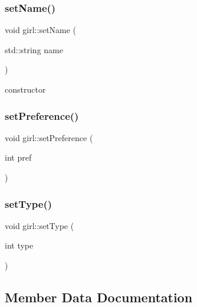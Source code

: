 \mbox{\label{classgirl_acbf8f5cee4f0cf24df3c96fc43666b43}} 
\subsubsection{\texorpdfstring{set\+Name()}{setName()}}
{\footnotesize\ttfamily void girl\+::set\+Name (\begin{DoxyParamCaption}\item[{std\+::string}]{name }\end{DoxyParamCaption})}



constructor 

\mbox{\label{classgirl_afdd10cabb120b9bbc44c8c243168baf3}} 
\subsubsection{\texorpdfstring{set\+Preference()}{setPreference()}}
{\footnotesize\ttfamily void girl\+::set\+Preference (\begin{DoxyParamCaption}\item[{int}]{pref }\end{DoxyParamCaption})}

\mbox{\label{classgirl_a85b694210361853ec1fee3f232491009}} 
\subsubsection{\texorpdfstring{set\+Type()}{setType()}}
{\footnotesize\ttfamily void girl\+::set\+Type (\begin{DoxyParamCaption}\item[{int}]{type }\end{DoxyParamCaption})}



\subsection{Member Data Documentation}
\mbox{\label{classgirl_a0d038ec12424d8b11fa0442bfa6fe2d6}} 
